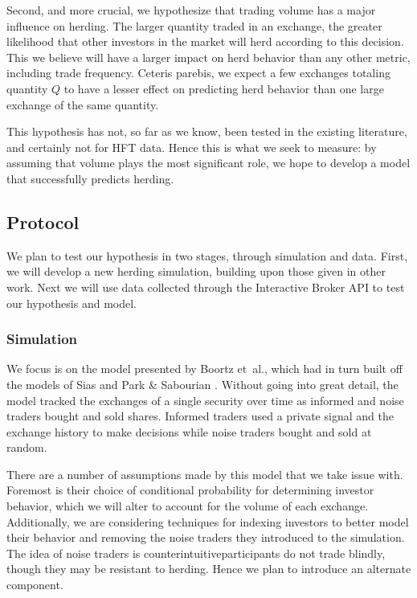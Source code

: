\documentclass{article}
\begin{document}
Second, and more crucial, we hypothesize that trading volume has a major influence on herding. 
The larger quantity traded in an exchange, the greater likelihood that other investors in the market will herd according to this decision.
This we believe will have a larger impact on herd behavior than any other metric, including trade frequency.
Ceteris parebis, we expect a few exchanges totaling quantity $Q$ to have a lesser effect on predicting herd behavior than one large exchange of the same quantity.

This hypothesis has not, so far as we know, been tested in the existing literature, and certainly not for HFT data.
Hence this is what we seek to measure: by assuming that volume plays the most significant role, we hope to develop a model that successfully predicts herding.

\subsection*{Protocol}
We plan to test our hypothesis in two stages, through simulation and data.
First, we will develop a new herding simulation, building upon those given in other work.
Next we will use data collected through the Interactive Broker API to test our hypothesis and model. 

\subsubsection*{Simulation}
We focus is on the model presented by Boortz et~al., which had in turn built off the models of Sias and Park \& Sabourian \cite{boortz,sias2004institutional,park2011herding}.
Without going into great detail, the model tracked the exchanges of a single security over time as informed and noise traders bought and sold shares.
Informed traders used a private signal and the exchange history to make decisions while noise traders bought and sold at random.

There are a number of assumptions made by this model that we take issue with. 
Foremost is their choice of conditional probability for determining investor behavior, which we will alter to account for the volume of each exchange.
Additionally, we are considering techniques for indexing investors to better model their behavior and removing the noise traders they introduced to the simulation.
The idea of noise traders is counterintuitive\textemdash participants do not trade blindly, though they may be resistant to herding.
Hence we plan to introduce an alternate component.
\end{document}
